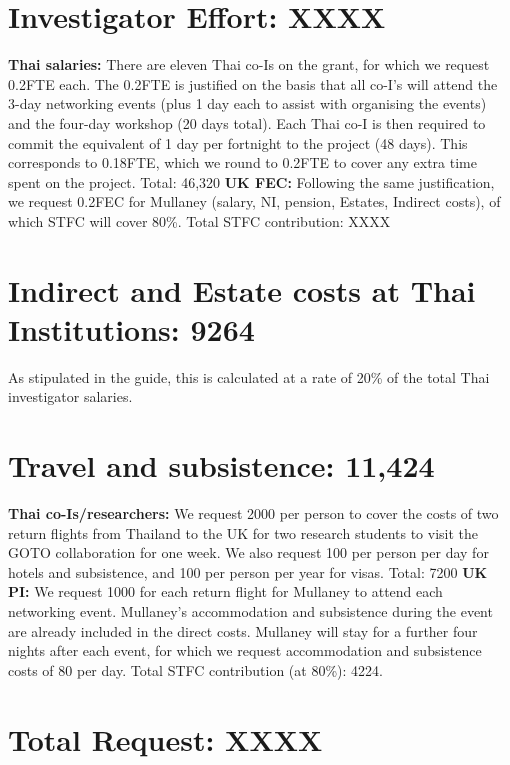 \documentclass[11pt]{article}
\begin{document}
  \section{Investigator Effort: XXXX}
  \vspace{-3mm}
  {\bf Thai salaries:} There are eleven Thai co-Is on the grant, for which we request 0.2FTE each. The 0.2FTE is justified on the basis that all co-I's will attend the 3-day networking events (plus 1 day each to assist with organising the events) and the four-day workshop (20 days total). Each Thai co-I is then required to commit the equivalent of 1 day per fortnight to the project (48 days). This corresponds to 0.18FTE, which we round to 0.2FTE to cover any extra time spent on the project. Total: 46,320 {\bf UK FEC:} Following the same justification, we request 0.2FEC for Mullaney (salary, NI, pension, Estates, Indirect costs), of which STFC will cover 80\%. Total STFC contribution: XXXX
  
  \vspace{-3mm}
  \section{Indirect and Estate costs at Thai Institutions: 9264}
  \vspace{-3mm}
  As stipulated in the guide, this is calculated at a rate of 20\% of the total Thai investigator salaries.
  
  \vspace{-3mm}
  \section{Travel and subsistence: 11,424}
  \vspace{-3mm}
  {\bf Thai co-Is/researchers:} We request 2000 per person to cover the costs of two return flights from Thailand to the UK for two research students to visit the GOTO collaboration for one week. We also request 100 per person per day for hotels and subsistence, and 100 per person per year for visas. Total: 7200 {\bf UK PI:} We request 1000 for each return flight for Mullaney to attend each networking event. Mullaney's accommodation and subsistence during the event are already included in the direct costs. Mullaney will stay for a further four nights after each event, for which we request accommodation and subsistence costs of 80 per day. Total STFC contribution (at 80\%): 4224.
  
  \vspace{-3mm}
  \section{Total Request: XXXX}
  
  
\end{document}
